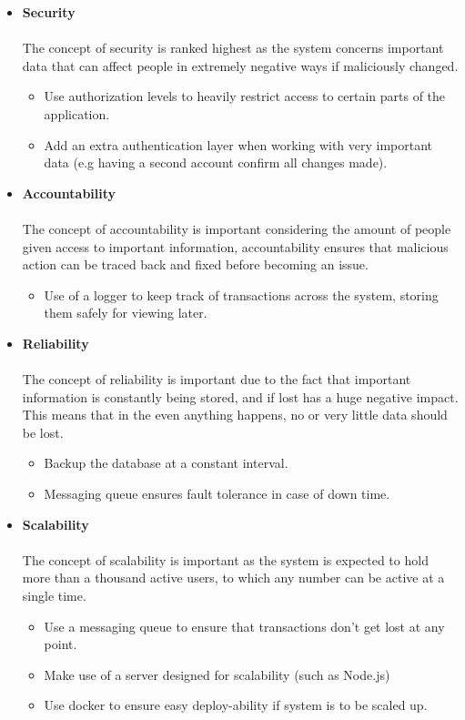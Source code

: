 \documentclass[12pt]{article}
\begin{document}
\begin{itemize}
	\item \textbf{Security}\\\\
	The concept of security is ranked highest as the system concerns important data that can affect people in extremely negative ways if maliciously changed.
	\begin{itemize}
		\item Use authorization levels to heavily restrict access to certain parts of the application.
		\item Add an extra authentication layer when working with very important data (e.g having a second account confirm all changes made).
	\end{itemize}
	
	\item \textbf{Accountability}\\\\
	The concept of accountability is important considering the amount of people given access to important information, accountability ensures that malicious action can be traced back and fixed before becoming an issue.
	\begin{itemize}
		\item Use of a logger to keep track of transactions across the system, storing them safely for viewing later.
	\end{itemize}
	
	\item \textbf{Reliability}\\\\
	The concept of reliability is important due to the fact that important information is constantly being stored, and if lost has a huge negative impact. This means that in the even anything happens, no or very little data should be lost.
	\begin{itemize}
		\item Backup the database at a constant interval.
		\item Messaging queue ensures fault tolerance in case of down time.
	\end{itemize}
	
	\item \textbf{Scalability}\\\\
	The concept of scalability is important as the system is expected to hold more than a thousand active users, to which any number can be active at a single time.
	\begin{itemize}
		\item Use a messaging queue to ensure that transactions don't get lost at any point.
		\item Make use of a server designed for scalability (such as Node.js)
		\item Use docker to ensure easy deploy-ability if system is to be scaled up.
	\end{itemize}
	

\end{itemize}
\end{document}
